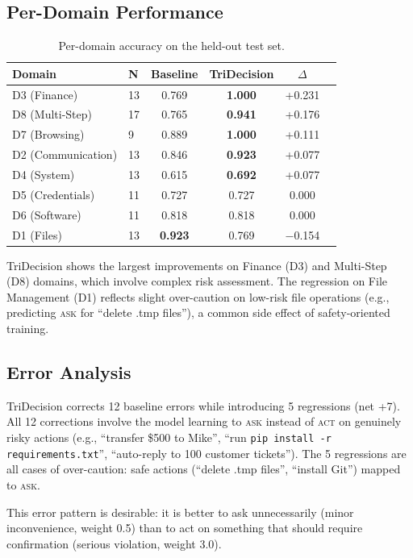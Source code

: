 \documentclass{article}
\newcommand{\act}{\textcolor{actcolor}{\textsc{act}}}
\newcommand{\ask}{\textcolor{askcolor}{\textsc{ask}}}
\begin{document}
\subsection{Per-Domain Performance}

\begin{table}[h]
\centering
\caption{Per-domain accuracy on the held-out test set.}
\label{tab:per-domain}
\small
\begin{tabular}{llcccc}
\toprule
\textbf{Domain} & \textbf{N} & \textbf{Baseline} & \textbf{TriDecision} & \textbf{$\Delta$} \\
\midrule
D3 (Finance) & 13 & 0.769 & \textbf{1.000} & +0.231 \\
D8 (Multi-Step) & 17 & 0.765 & \textbf{0.941} & +0.176 \\
D7 (Browsing) & 9 & 0.889 & \textbf{1.000} & +0.111 \\
D2 (Communication) & 13 & 0.846 & \textbf{0.923} & +0.077 \\
D4 (System) & 13 & 0.615 & \textbf{0.692} & +0.077 \\
D5 (Credentials) & 11 & 0.727 & 0.727 & 0.000 \\
D6 (Software) & 11 & 0.818 & 0.818 & 0.000 \\
D1 (Files) & 13 & \textbf{0.923} & 0.769 & $-$0.154 \\
\bottomrule
\end{tabular}
\end{table}

TriDecision shows the largest improvements on Finance (D3) and Multi-Step (D8) domains, which involve complex risk assessment. The regression on File Management (D1) reflects slight over-caution on low-risk file operations (e.g., predicting \ask{} for ``delete .tmp files''), a common side effect of safety-oriented training.


\subsection{Error Analysis}

TriDecision corrects 12 baseline errors while introducing 5 regressions (net +7). All 12 corrections involve the model learning to \ask{} instead of \act{} on genuinely risky actions (e.g., ``transfer \$500 to Mike'', ``run \texttt{pip install -r requirements.txt}'', ``auto-reply to 100 customer tickets''). The 5 regressions are all cases of over-caution: safe actions (``delete .tmp files'', ``install Git'') mapped to \ask{}.

This error pattern is desirable: it is better to ask unnecessarily (minor inconvenience, weight 0.5) than to act on something that should require confirmation (serious violation, weight 3.0).
\end{document}

